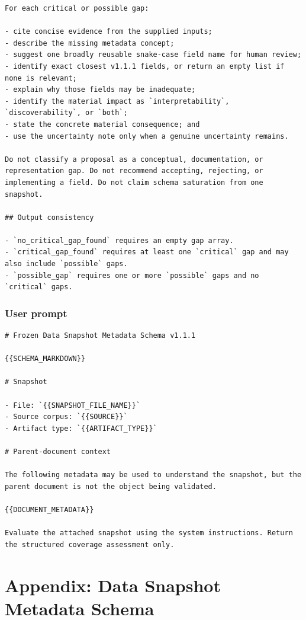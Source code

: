 \documentclass{article}
\begin{document}
\begin{lstlisting}
For each critical or possible gap:

- cite concise evidence from the supplied inputs;
- describe the missing metadata concept;
- suggest one broadly reusable snake-case field name for human review;
- identify exact closest v1.1.1 fields, or return an empty list if none is relevant;
- explain why those fields may be inadequate;
- identify the material impact as `interpretability`, `discoverability`, or `both`;
- state the concrete material consequence; and
- use the uncertainty note only when a genuine uncertainty remains.

Do not classify a proposal as a conceptual, documentation, or representation gap. Do not recommend accepting, rejecting, or implementing a field. Do not claim schema saturation from one snapshot.

## Output consistency

- `no_critical_gap_found` requires an empty gap array.
- `critical_gap_found` requires at least one `critical` gap and may also include `possible` gaps.
- `possible_gap` requires one or more `possible` gaps and no `critical` gaps.
\end{lstlisting}

\subsubsection{User prompt}

\begin{lstlisting}
# Frozen Data Snapshot Metadata Schema v1.1.1

{{SCHEMA_MARKDOWN}}

# Snapshot

- File: `{{SNAPSHOT_FILE_NAME}}`
- Source corpus: `{{SOURCE}}`
- Artifact type: `{{ARTIFACT_TYPE}}`

# Parent-document context

The following metadata may be used to understand the snapshot, but the parent document is not the object being validated.

{{DOCUMENT_METADATA}}

Evaluate the attached snapshot using the system instructions. Return the structured coverage assessment only.
\end{lstlisting}

\section{Appendix: Data Snapshot Metadata Schema}
\label{appendix:schema}
\end{document}
